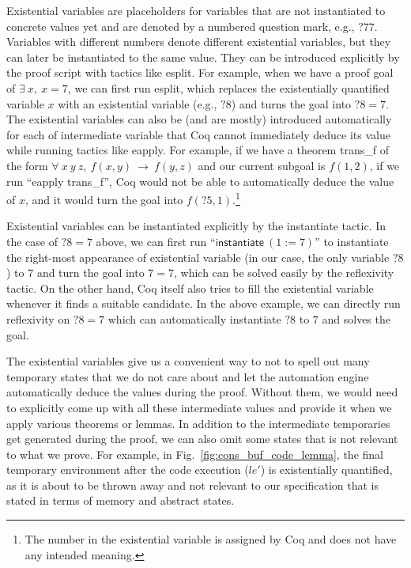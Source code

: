 Existential variables are placeholders for
variables that are not instantiated to concrete values yet and are
denoted by a numbered question mark, e.g., $?77$. Variables with different numbers
denote different existential variables, but they can later be instantiated to
the same value. They can be introduced explicitly by the proof script with
tactics like \textsf{esplit}. For example, when we have a proof goal of
$\exists~x,~x=7$, we can first run \textsf{esplit}, which replaces the existentially
quantified variable $x$ with an existential variable (e.g., $?8$) and turns the
goal into $?8=7$. The existential variables can also be (and are mostly) introduced
automatically for each of intermediate variable that Coq cannot immediately
deduce its value while running tactics like \textsf{eapply}.
For example, if we have a theorem \textsf{trans\_f} of the form
$\forall~x~y~z,~f(x,y)~\rightarrow~f(y,z)$ and our current subgoal is $f(1,2)$,
if we run ``\textsf{eapply} \textsf{trans\_f}'', Coq would not be able to
automatically deduce the value of $x$, and it would turn the goal into
$f(?5, 1)$.\footnote{The number in the existential variable is assigned by
Coq and does not have any intended meaning.}

Existential variables can be instantiated explicitly by the \textsf{instantiate}
tactic. In the case of $?8=7$ above, we can first run
``$\textsf{instantiate}~(1:=7)$'' to instantiate the right-most appearance of
existential variable (in our case, the only variable $?8$) to $7$ and turn
the goal into $7=7$, which can be solved easily by the \textsf{reflexivity} tactic.
On the other hand, Coq itself also tries to fill the existential variable
whenever it finds a suitable candidate. In the above example, we can directly
run \textsf{reflexivity} on $?8=7$ which can automatically instantiate
$?8$ to $7$ and solves the goal.

The existential variables give us a convenient way to not to spell out many
temporary states that we do not care about and let the automation engine
automatically deduce the values during the proof. Without them, we would need
to explicitly come up with all these intermediate values and provide it when
we apply various theorems or lemmas. In addition to the intermediate temporaries
get generated during the proof, we can also omit some states that is not
relevant to what we prove. For example, in Fig.~\ref{fig:cons_buf_code_lemma},
the final temporary environment after the code execution ($le'$) is existentially
quantified, as it is about to be thrown away and not relevant to our specification
that is stated in terms of memory and abstract states.

